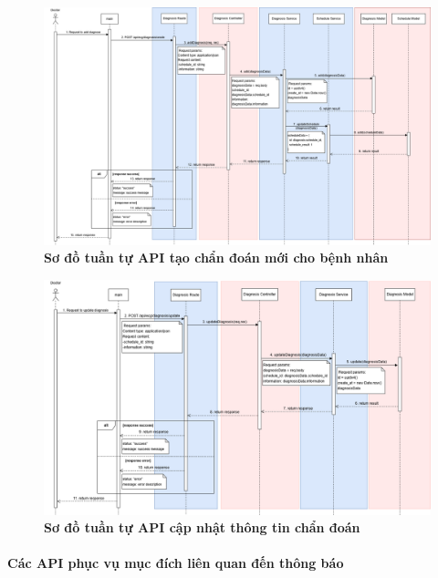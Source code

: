 \begin{figure}[H]
	\centering
	\includegraphics[width=16cm]{Images/api_sequence/diag/create.drawio.png}
	\caption[Sơ đồ tuần tự API tạo chẩn đoán mới cho bệnh nhân]{\bfseries \fontsize{12pt}{0pt}\selectfont Sơ đồ tuần tự API tạo chẩn đoán mới cho bệnh nhân}
	\label{sequence_diagram_create_diagnosis}
\end{figure}

\begin{figure}[H]
	\centering
	\includegraphics[width=16cm]{Images/api_sequence/diag/update.drawio.png}
	\caption[Sơ đồ tuần tự API cập nhật thông tin chẩn đoán]{\bfseries \fontsize{12pt}{0pt}\selectfont Sơ đồ tuần tự API cập nhật thông tin chẩn đoán}
	\label{sequence_diagram_update_diagnosis}
\end{figure}

\cleardoublepage
\paragraph{Các API phục vụ mục đích liên quan đến thông báo}
\mbox{}


